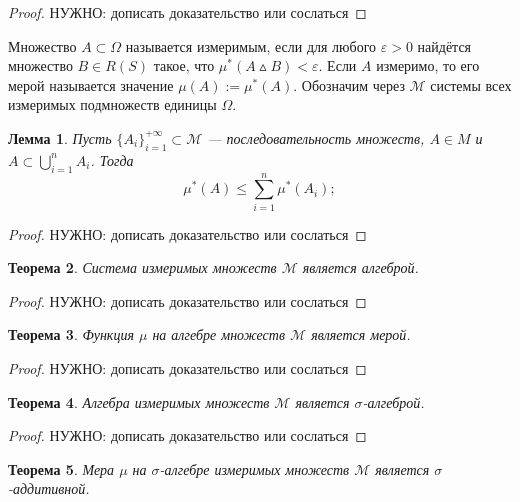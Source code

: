 \documentclass[12pt]{article}
\newtheorem{theorem}{Теорема}
\newtheorem{lemma}[theorem]{Лемма}
\numberwithin{theorem}{section}
\theoremstyle{definition}
\newcommand{\calM}{\mathcal{M}}
\newcommand{\defin}[2]{\hypertarget{#2}{{\color{red} #1}}}
\newcommand{\TODO}[1]{\textcolor{todocolor}{НУЖНО: #1}}
\begin{document}
	\begin{proof}
		\TODO{дописать доказательство или сослаться}
	\end{proof}
	
	Множество $ A \subset \Omega $ называется \defin{измеримым}{measurable-set}, если для любого $ \varepsilon > 0 $
	найдётся множество $ B \in R(S) $ такое, что $ \mu^*(A \vartriangle B) < \varepsilon $.
	Если $ A $ измеримо, то его \defin{мерой}{measure of set} называется значение $ \mu(A) := \mu^*(A) $.
	Обозначим через $ \calM $ системы всех измеримых подмножеств единицы $ \Omega $.
	
	\begin{lemma}
		Пусть $ \{A_i\}_{i = 1}^{+\infty} \subset \calM $ --- последовательность множеств,
		$ A \in M $
		и $ A \subset \bigcup\limits_{i = 1}^{n} A_i $.
		Тогда $$ \mu^*(A) \leqslant \sum\limits_{i = 1}^{n} \mu^*(A_i); $$
	\end{lemma}
	
	\begin{proof}
		\TODO{дописать доказательство или сослаться}
	\end{proof}
	
	\begin{theorem}
		Система измеримых множеств $ \calM $ является алгеброй.
	\end{theorem}
	
	\begin{proof}
		\TODO{дописать доказательство или сослаться}
	\end{proof}
	
	\begin{theorem}
		Функция $ \mu $ на алгебре множеств $ \calM $ является мерой.
	\end{theorem}
	
	\begin{proof}
		\TODO{дописать доказательство или сослаться}
	\end{proof}
	
	\begin{theorem}
		Алгебра измеримых множеств $ \calM $ является $ \sigma $-алгеброй.
	\end{theorem}
	
	\begin{proof}
		\TODO{дописать доказательство или сослаться}
	\end{proof}
	
	\begin{theorem}
		Мера $ \mu $ на $ \sigma $-алгебре измеримых множеств $ \calM $ является $ \sigma $-аддитивной.
	\end{theorem}
	
\end{document}
